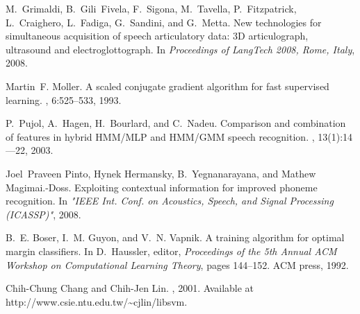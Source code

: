 \documentclass[10pt]{article}
\begin{document}
\begin{thebibliography}{99}

M.~Grimaldi, B.~Gili~Fivela, F.~Sigona, M.~Tavella, P.~Fitzpatrick,
  L.~Craighero, L.~Fadiga, G.~Sandini, and G.~Metta.
\newblock New technologies for simultaneous acquisition of speech articulatory
  data: 3{D} articulograph, ultrasound and electroglottograph.
\newblock In {\em Proceedings of LangTech 2008, Rome, Italy}, 2008.

Martin~F. Moller.
\newblock A scaled conjugate gradient algorithm for fast supervised learning.
, 6:525--533, 1993.

P.~Pujol, A.~Hagen, H.~Bourlard, and C.~Nadeu.
\newblock Comparison and combination of features in hybrid {HMM/MLP} and
  {HMM/GMM} speech recognition.
,
  13(1):14---22, 2003.

Joel~Praveen Pinto, Hynek Hermansky, B.~Yegnanarayana, and Mathew
  Magimai.-Doss.
\newblock Exploiting contextual information for improved phoneme recognition.
\newblock In {\em "{IEEE} Int. Conf. on Acoustics, Speech, and Signal
  Processing ({ICASSP})"}, 2008.

B.~E. Boser, I.~M. Guyon, and V.~N. Vapnik.
\newblock A training algorithm for optimal margin classifiers.
\newblock In D.~Haussler, editor, {\em Proceedings of the 5th Annual ACM
  Workshop on Computational Learning Theory}, pages 144--152. ACM press, 1992.

Chih-Chung Chang and Chih-Jen Lin.
, 2001.
\newblock Available at http://www.csie.ntu.edu.tw/\~{}cjlin/libsvm.

\end{thebibliography}
\end{document}
